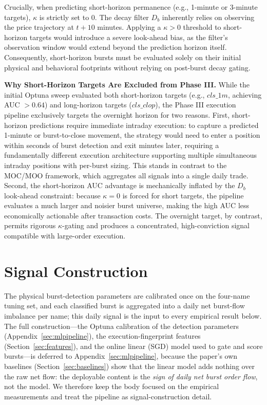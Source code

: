 \documentclass[11pt]{article}
\begin{document}
Crucially, when predicting short-horizon permanence (e.g., 1-minute or 3-minute targets), $\kappa$ is strictly set to 0. The decay filter $D_b$ inherently relies on observing the price trajectory at $t+10$ minutes. Applying a $\kappa > 0$ threshold to short-horizon targets would introduce a severe look-ahead bias, as the filter's observation window would extend beyond the prediction horizon itself. Consequently, short-horizon bursts must be evaluated solely on their initial physical and behavioral footprints without relying on post-burst decay gating.

\textbf{Why Short-Horizon Targets Are Excluded from Phase III.} While the initial Optuna sweep evaluated both short-horizon targets (e.g., $cls\_1m$, achieving AUC $> 0.64$) and long-horizon targets ($cls\_clop$), the Phase III execution pipeline exclusively targets the overnight horizon for two reasons. First, short-horizon predictions require immediate intraday execution: to capture a predicted 1-minute or burst-to-close movement, the strategy would need to enter a position within seconds of burst detection and exit minutes later, requiring a fundamentally different execution architecture supporting multiple simultaneous intraday positions with per-burst sizing. This stands in contrast to the MOC/MOO framework, which aggregates all signals into a single daily trade. Second, the short-horizon AUC advantage is mechanically inflated by the $D_b$ look-ahead constraint: because $\kappa=0$ is forced for short targets, the pipeline evaluates a much larger and noisier burst universe, making the high AUC less economically actionable after transaction costs. The overnight target, by contrast, permits rigorous $\kappa$-gating and produces a concentrated, high-conviction signal compatible with large-order execution.

\section{Signal Construction}
\label{sec:signal}
The physical burst-detection parameters are calibrated once on the four-name tuning set, and each classified burst is aggregated into a daily net burst-flow imbalance per name; this daily signal is the input to every empirical result below. The full construction---the Optuna calibration of the detection parameters (Appendix~\ref{sec:mlpipeline}), the execution-fingerprint features (Section~\ref{sec:features}), and the online linear (SGD) model used to gate and score bursts---is deferred to Appendix~\ref{sec:mlpipeline}, because the paper's own baselines (Section~\ref{sec:baselines}) show that the linear model adds nothing over the raw net flow: the deployable content is the \emph{sign of daily net burst order flow}, not the model. We therefore keep the body focused on the empirical measurements and treat the pipeline as signal-construction detail.
\end{document}
